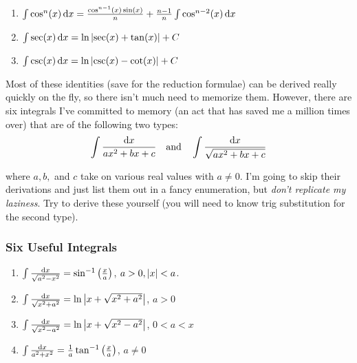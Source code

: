 \documentclass{article}
\begin{document}
{\begin{enumerate}
      \item \(\int \cos^n(x) \, \mathrm{d} x = \frac{\cos^{n-1}(x) \sin(x)}{n} + \frac{n-1}{n} \int \cos^{n-2}(x) \, \mathrm{d} x\)
      
      \item \(\int \sec(x) \, \mathrm{d} x = \ln\left\lvert \sec(x) + \tan(x)\right\rvert + C\)
      
      \item \(\int \csc(x) \, \mathrm{d} x = \ln\left\lvert \csc(x) -\cot(x)\right\rvert + C\)
       
    \end{enumerate}

    Most of these identities (save for the reduction formulae)  can be derived really quickly on the fly, so there isn't much need to memorize them. However, there are six integrals I've committed to memory (an act that has saved me a million times over) that are of the following two types:
    \begin{align*}
      \int \frac{\mathrm{d} x}{ax^2 + bx + c} \quad \text{and} \quad \int \frac{\mathrm{d} x}{\sqrt{ax^2 + bx + c}}
    \end{align*}

    where \(a, b,\) and \(c\) take on various real values with \(a \neq 0\). I'm going to skip their derivations and just list them out in a fancy enumeration, but \emph{don't replicate my laziness}. Try to derive these yourself (you will need to know trig substitution for the second type).

    \subsubsection*{Six Useful Integrals}
    \begin{enumerate}
      \item \(\int \frac{\mathrm{d} x}{\sqrt{a^2-x^2}} = \sin^{-1}\left(\frac{x}{a}\right)\), \hspace*{1cm} \(a > 0, \left\lvert x\right\rvert < a\).
      
      \item \(\int \frac{\mathrm{d} x}{\sqrt{x^2+a^2}} = \ln\left\lvert x + \sqrt{x^2 + a^2}\right\rvert\), \hspace*{1cm} \(a > 0\)
    
      \item \(\int \frac{\mathrm{d} x}{\sqrt{x^2 - a^2}} = \ln\left\lvert x + \sqrt{x^2 - a^2}\right\rvert\), \hspace*{1cm} \(0 < a < x\)
      
      \item \(\int \frac{\mathrm{d} x}{a^2 + x^2} = \frac{1}{a}\tan^{-1}\left(\frac{x}{a}\right)\),\hspace*{1cm} \(a \neq 0\)
      

\end{enumerate}}
\end{document}
